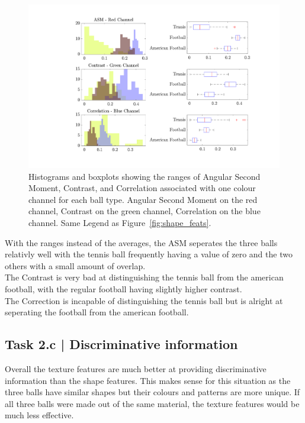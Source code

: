 \documentclass[conference]{IEEEtran}
\begin{document}
        \begin{figure}[htbp]
            \centering
            \includegraphics[width=\columnwidth]{figures/ranges.pdf}
            \caption[]{Histograms and boxplots showing the ranges of Angular Second Moment, Contrast, and Correlation associated with one colour channel for each ball type.
                Angular Second Moment on the red channel,
                Contrast on the green channel,
                Correlation on the blue channel. Same Legend as Figure~\ref{fig:shape_feats}.~\label{fig:tex_feats_ranges}
            }
        \end{figure}

        With the ranges instead of the averages, the ASM seperates the three balls relativly well with the tennis ball frequently having a value
        of zero and the two others with a small amount of overlap.\\
        The Contrast is very bad at distinguishing the tennis ball from the american football, with the regular football having slightly higher 
        contrast.\\
        The Correction is incapable of distinguishing the tennis ball but is alright at seperating the football from the american football.


    \subsection*{Task 2.c | Discriminative information}
        Overall the texture features are much better at providing discriminative information than the shape features. This makes sense
        for this situation as the three balls have similar shapes but their colours and patterns are more unique. If all three balls 
        were made out of the same material, the texture features would be much less effective.
\end{document}
